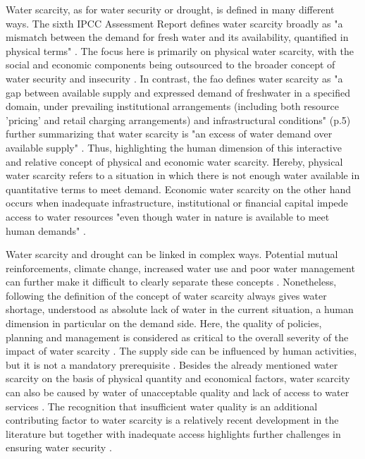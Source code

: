Water scarcity, as for water security or drought, is defined in many different ways. The sixth IPCC Assessment Report defines water scarcity broadly as "a mismatch between the demand for fresh water and its availability, quantified in physical terms" \autocite[560]{caretta2022water}. The focus here is primarily on physical water scarcity, with the social and economic components being outsourced to the broader concept of water security and insecurity \autocite{caretta2022water}. In contrast, the \acrfull{fao} defines water scarcity as "a gap between available supply and expressed demand of freshwater in a specified domain, under prevailing institutional arrangements (including both resource 'pricing' and retail charging arrangements) and infrastructural conditions" (p.5) further summarizing that water scarcity is "an excess of water demand over available supply" \autocite[6]{faoCopingWaterScarcity2012}. Thus, highlighting the human dimension of this interactive and relative concept of physical and economic water scarcity. Hereby, physical water scarcity refers to a situation in which there is not enough water available in quantitative terms to meet demand. Economic water scarcity on the other hand occurs when inadequate infrastructure, institutional or financial capital impede access to water resources "even though water in nature is available to meet human demands" \autocites[11]{moldenWaterFoodWater2007}.\newline

Water scarcity and drought can be linked in complex ways. Potential mutual reinforcements, climate change, increased water use and poor water management can further make it difficult to clearly separate these concepts \autocite{idmpDroughtWaterScarcity2022,lealfilhoUnderstandingResponsesClimaterelated2022,liuWaterScarcityAssessments2017,rcrcFORECASTBASEDFINANCINGEARLY2020}. Nonetheless, following the definition of \textcite{faoCopingWaterScarcity2012} the concept of water scarcity always gives water shortage, understood as absolute lack of water in the current situation, a human dimension in particular on the demand side. Here, the quality of policies, planning and management is considered as critical to the overall severity of the impact of water scarcity \autocite{idmpDroughtWaterScarcity2022,faoCopingWaterScarcity2012,undrrSpecialReportDrought2021}. The supply side can be influenced by human activities, but it is not a mandatory prerequisite \autocite{idmpDroughtWaterScarcity2022}.\newline
Besides the already mentioned water scarcity on the basis of physical quantity and economical factors, water scarcity can also be caused by water of unacceptable quality and lack of access to water services \autocite{faoCopingWaterScarcity2012}. The recognition that insufficient water quality is an additional contributing factor to water scarcity is a relatively recent development in the literature but together with inadequate access highlights further challenges in ensuring water security \autocite{caretta2022water, mishraWaterSecurityChanging2021,liuThreedimensionalWaterScarcity2020}. 

